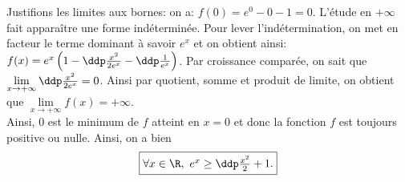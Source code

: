 \begin{correction}
\begin{enumerate}
\begin{center}
\end{center}
Justifions les limites aux bornes: on a: $f(0)=e^0-0-1=0$. L'\'etude en $+\infty$ fait appara\^{i}tre une forme ind\'etermin\'ee. Pour lever l'ind\'etermination, on met en facteur le terme dominant \`{a} savoir $e^x$ et on obtient ainsi: $f(x)=e^x\left( 1-\ddp\frac{x^2}{2e^x}-\ddp\frac{1}{e^x}  \right)$. Par croissance compar\'ee, on sait que $\lim\limits_{x\to +\infty} \ddp\frac{x^2}{2e^x}=0$. Ainsi par quotient, somme et produit de limite, on obtient que $\lim\limits_{x\to +\infty}  f(x)=+\infty$.\\
\noindent Ainsi, $0$ est le minimum de $f$ atteint en $x=0$ et donc la fonction $f$ est toujours positive ou nulle. Ainsi, on a bien 
$$\fbox{$ \forall x\in \R,\ e^x\geq \ddp \frac{x^2}{2}+1. $}$$

\end{enumerate}
\end{correction}
